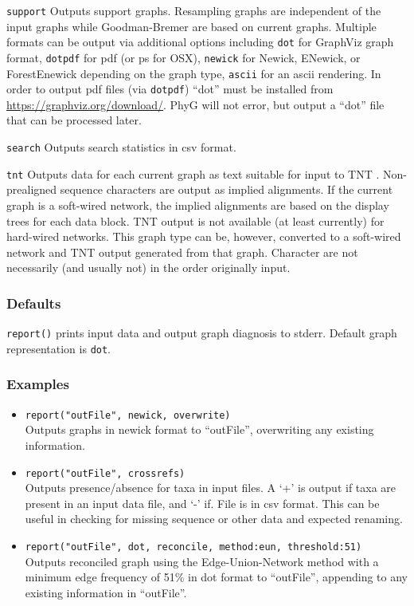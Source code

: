 \documentclass[11pt]{article}
\begin{document}
				\smallskip
				\noindent \texttt{support} Outputs  support graphs.  Resampling graphs are independent 
					of the input graphs while Goodman-Bremer are based on current graphs.   Multiple formats can be output via additional options including  \texttt{dot} for GraphViz graph format, \texttt{dotpdf} for pdf (or ps for OSX), 
					\texttt{newick} for Newick, ENewick, or ForestEnewick depending on the graph type, \texttt{ascii} for an ascii rendering.  In  order to output pdf files (via \texttt{dotpdf}) ``dot'' must be installed from \url{https://graphviz.org/download/}.  PhyG will not error, but output a ``dot'' file that can be processed later.
				
				\smallskip
				\noindent \texttt{search} Outputs search statistics in csv format. 
				 
				\smallskip
				\noindent \texttt{tnt} Outputs data for each current graph as text suitable for input to TNT \citep{Goloboffetal2008}.  Non-prealigned sequence characters are output as implied alignments.  If the current graph is a soft-wired network, the implied alignments are based on the display trees for each data block. TNT output is not available (at least currently) for hard-wired networks.  This graph type can be, however, converted to a soft-wired network and TNT output generated from that graph. Character are not necessarily (and usually not) in the order originally input.
				
		\subsubsection{Defaults}
				\texttt{report()} prints input data and output graph diagnosis  to stderr.  Default graph representation is \texttt{dot}.
		\subsubsection{Examples}
				\begin{itemize}
					\item{\texttt{report("outFile", newick, overwrite)}\\ Outputs graphs in newick format to ``outFile'', overwriting any existing information.}
					\item{\texttt{report("outFile", crossrefs)}\\ Outputs presence/absence for taxa in input files.  A `+' is output  if taxa are present in an input data file, 
					and `-' if. File is in csv format.  This can be useful in checking for missing sequence or other data and expected renaming.}
					\item{\texttt{report("outFile", dot, reconcile, method:eun, threshold:51)}\\ Outputs reconciled graph using the Edge-Union-Network method with a minimum edge frequency of 51\% in dot format to ``outFile'', appending to any existing information in ``outFile''.}
				\end{itemize}
			
\end{document}
